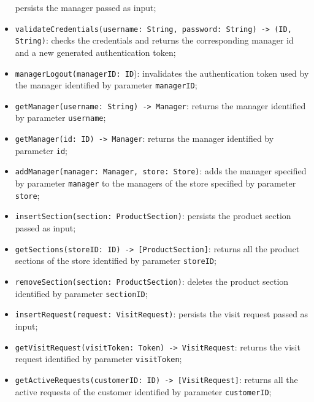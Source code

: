 \documentclass[a4paper,oneside,11pt]{book}
\newcommand{\red}[1]{\begingroup\color{punct}#1\endgroup}
\begin{document}
\begin{itemize}
       persists the manager passed as input;
       \item \texttt{validateCredentials(username: \red{String}, password: \red{String}) -> \newline (\red{ID}, \red{String})}: \newline
       checks the credentials and returns the corresponding manager id and a new generated authentication token;
       \item \texttt{managerLogout(managerID: \red{ID}}): \newline
       invalidates the authentication token used by the manager identified by parameter \texttt{managerID};
       \item \texttt{getManager(username: \red{String}) -> \red{Manager}}: \newline returns the manager identified by parameter \texttt{username};
       \item \texttt{getManager(id: \red{ID}) -> \red{Manager}}: \newline
       returns the manager identified by parameter \texttt{id};
       \item \texttt{addManager(manager: \red{Manager}, store: \red{Store})}: \newline
       adds the manager specified by parameter \texttt{manager} to the managers of the store specified by parameter \texttt{store};
       \item \texttt{insertSection(section: \red{ProductSection})}: \newline
       persists the product section passed as input;
       \item \texttt{getSections(storeID: \red{ID}) -> [\red{ProductSection}]}: \newline
       returns all the product sections of the store identified by parameter \texttt{storeID};
       \item \texttt{removeSection(section: \red{ProductSection})}: \newline
       deletes the product section identified by parameter \texttt{sectionID};
       \item \texttt{insertRequest(request: \red{VisitRequest})}: \newline
       persists the visit request passed as input;
       \item \texttt{getVisitRequest(visitToken: \red{Token}) -> \red{VisitRequest}}: \newline
       returns the visit request identified by parameter \texttt{visitToken};
       \item \texttt{getActiveRequests(customerID: \red{ID}) -> [\red{VisitRequest}]}: returns all the active requests of the customer identified by parameter \texttt{customerID};

\end{itemize}
\end{document}
